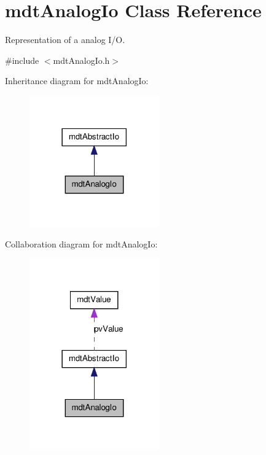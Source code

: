 \hypertarget{classmdt_analog_io}{
\section{mdtAnalogIo Class Reference}
\label{classmdt_analog_io}
}


Representation of a analog I/O.  




{\ttfamily \#include $<$mdtAnalogIo.h$>$}



Inheritance diagram for mdtAnalogIo:\nopagebreak
\begin{figure}[H]
\begin{center}
\leavevmode
\includegraphics[width=158pt]{classmdt_analog_io__inherit__graph}
\end{center}
\end{figure}


Collaboration diagram for mdtAnalogIo:\nopagebreak
\begin{figure}[H]
\begin{center}
\leavevmode
\includegraphics[width=158pt]{classmdt_analog_io__coll__graph}
\end{center}
\end{figure}
